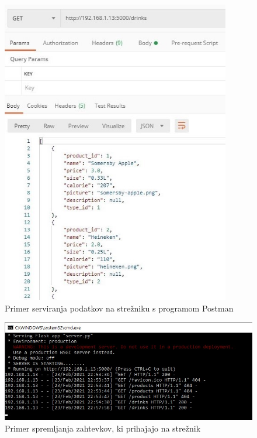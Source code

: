 \documentclass[a4paper, 12pt]{book}
\begin{document}
\begin{figure}[!htb]
\begin{center}
\includegraphics[width=10cm]{Server_example.jpg}
\end{center}
\caption{Primer serviranja podatkov na strežniku s programom Postman}
\label{ServerEX}
\end{figure}

\begin{figure}[!htb]
\begin{center}
\includegraphics[width=12cm]{Server_example_2.jpg}
\end{center}
\caption{Primer spremljanja zahtevkov, ki prihajajo na strežnik}
\label{ServerEX2}
\end{figure}
\end{document}
